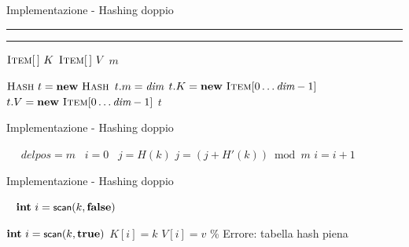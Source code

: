 \begin{frame}{Implementazione - Hashing doppio}


\vspace{-12pt}
\begin{Procedure}
\noindent\rule{\textwidth}{0.8pt}\hrulefill

\vspace{-15pt}
{\Hash}

\vspace{-9pt}
\noindent\rule{\textwidth}{0.8pt}\hrulefill

\vspace{-9pt}
$\textsc{Item}[\,]\ K$
$\textsc{Item}[\,]\ V$
\INTEGER $m$
\BlankLine

\PROCEDURE{\Hash \hashconstructor(\INTEGER $\hashsize$)}
{
  $\Hash\ t = \NEW\ \Hash$\;
  $t.m = \textit{dim}$\;
  $t.K = \NEW\ \Item[0 \mldots \hashsize-1]$\;
  $t.V = \NEW\ \Item[0 \mldots \hashsize-1]$\;
  \Return $t$\;
}
\BlankLine

\end{Procedure}
\end{frame}
 
\begin{frame}{Implementazione - Hashing doppio}
\vspace{-12pt}
\begin{Procedure}
\INTEGER\ 
{
  \INTEGER\ $\mathit{delpos} = m$
  \INTEGER\ $i = 0$
  \INTEGER\ $j = H(k)$
  {
    $j = (j + H'(k)) \bmod m$\;
    $i = i+1$\; 
  }
}
\BlankLine

\end{Procedure}
\end{frame}
 
\begin{frame}{Implementazione - Hashing doppio}
\vspace{-12pt}
\begin{Procedure}

\Item\ 
{
  $\INTEGER\ i = \hashscan(k, \FALSE)$\;
}
\BlankLine

{
  $\INTEGER\ i = \hashscan(k, \TRUE)$\;
  {
    $K[i] = k$\;
    $V[i] = v$\;
  }
  {
    \% Errore: tabella hash piena
  }
}
\end{Procedure}
\end{frame}
 
